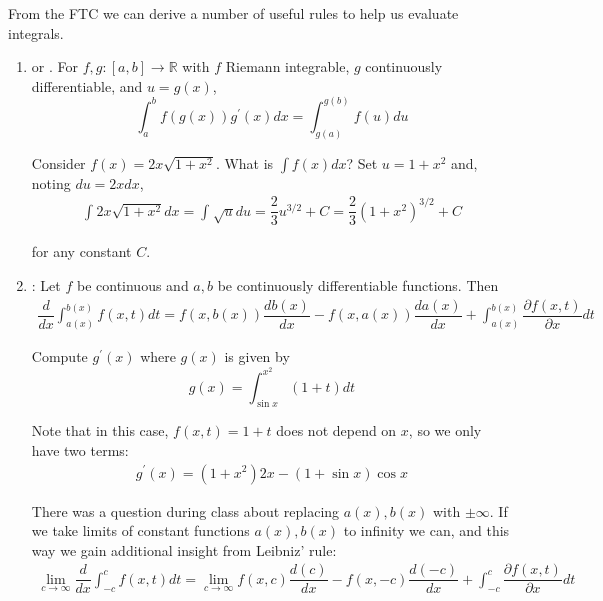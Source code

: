\documentclass{article}
\begin{document}
From the FTC we can derive a number of useful rules to help us evaluate integrals.
\begin{enumerate}
  \item {} or . For $f, g: [a, b] \to \mathbb{R}$ with $f$ Riemann integrable, $g$ continuously differentiable, and $u = g(x)$,
    \[
      \int_{a}^{b} f(g(x)) g^\prime(x) dx
      =
      \int_{g(a)}^{g(b)} f(u) du
    \]

    \begin{example}
      Consider $f(x) = 2x \sqrt{1 + x^2}$. What is $\int f(x) dx$? Set $u = 1 + x^2$ and, noting $du = 2x dx$,
      \begin{align*}
        \int_{}^{} 2x \sqrt{1 + x^2} dx
        =
        \int_{}^{} \sqrt{u} du
        =
        \dfrac{2}{3} u^{3/2} + C
        =
        \dfrac{2}{3} \left(1 + x^2\right)^{3/2} + C
      \end{align*}

      for any constant $C$.
    \end{example}

  \item {}: Let $f$ be continuous and $a, b$ be continuously differentiable functions. Then
    \begin{align*}
      \dfrac{d}{dx} \int_{a(x)}^{b(x)} f(x, t) dt
      =
      f(x, b(x)) \dfrac{db(x)}{dx}
      -
      f(x, a(x)) \dfrac{da(x)}{dx}
      +
      \int_{a(x)}^{b(x)}
      \dfrac{\partial f(x, t)}{\partial x} dt
    \end{align*}

    \begin{example}
      Compute $g^\prime(x)$ where $g(x)$ is given by
      \[
        g(x) = \int_{\sin x}^{x^2} (1 + t) dt
      \]

      Note that in this case, $f(x, t) = 1 + t$ does not depend  on $x$, so we only have two terms:
      \begin{align*}
        g^\prime(x)
        =
        (1 + x^2) 2x
        -
        (1 + \sin x) \cos x
      \end{align*}
    \end{example}

    \begin{remark}
      There was a question during class about replacing $a(x), b(x)$ with $\pm \infty$. If we take limits of constant functions $a(x), b(x)$ to infinity we can, and this way we gain additional insight from Leibniz' rule:
    \begin{align*}
      \lim_{c \to \infty}
      \dfrac{d}{dx} \int_{-c}^{c} f(x, t) dt
      =
      \lim_{c \to \infty}
      f(x, c) \dfrac{d (c)}{dx}
      -
      f(x, -c) \dfrac{d (-c)}{dx}
      +
      \int_{-c}^{c}
      \dfrac{\partial f(x, t)}{\partial x} dt
    \end{align*}


\end{remark}
\end{enumerate}
\end{document}

